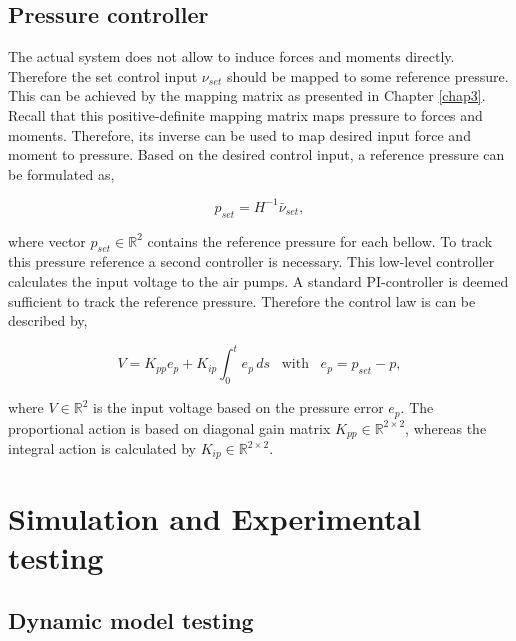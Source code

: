 \subsection{Pressure controller}


The actual system does not allow to induce forces and moments directly. Therefore the set control input $\nu_{set}$ should be mapped to some reference pressure. This can be achieved by the mapping matrix as presented in Chapter \ref{chap3}. Recall that this positive-definite mapping matrix maps pressure to forces and moments. Therefore, its inverse can be used to map desired input force and moment to pressure. Based on the desired control input, a reference pressure can be formulated as,

\begin{equation}
    p_{set} = H^{-1}\bar{\nu}_{set},
\end{equation}


where vector $p_{set} \in \mathbb{R}^2$ contains the reference pressure for each bellow. To track this pressure reference a second controller is necessary. This low-level controller calculates the input voltage to the air pumps. A standard PI-controller is deemed sufficient to track the reference pressure. Therefore the control law is can be described by,

\begin{equation}
    V = K_{pp}e_p + K_{ip} \int_0^t e_p \hspace{2pt} ds \hspace{10pt} \text{with} \hspace{10pt} e_p = p_{set} - p,
\end{equation}

where $V \in \mathbb{R}^2$ is the input voltage based on the pressure error $e_p$. The proportional action is based on diagonal gain matrix $K_{pp} \in \mathbb{R}^{2\times 2}$, whereas the integral action is calculated by $K_{ip} \in \mathbb{R}^{2\times 2}$.









\section{Simulation and Experimental testing}
\label{chap4b}

\subsection{Dynamic model testing}
\label{subsecDMt}


